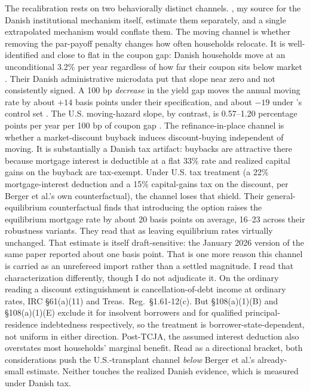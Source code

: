 \documentclass[12pt]{article}
\begin{document}
The recalibration rests on two behaviorally distinct channels. \citet{berger2026}, my source for the Danish institutional mechanism itself, estimate them separately, and a single extrapolated mechanism would conflate them. The moving channel is whether removing the par-payoff penalty changes how often households relocate. It is well-identified and close to flat in the coupon gap: Danish households move at an unconditional 3.2\% per year regardless of how far their coupon sits below market \citep[\S4.6, structural parameters in tab.~3]{berger2026}. Their Danish administrative microdata put that slope near zero and not consistently signed. A 100 bp \emph{decrease} in the yield gap moves the annual moving rate by about $+14$ basis points under their specification, and about $-19$ under \citeauthor{fonseca2024}'s control set \citep[\S3.3.2]{berger2026}. The U.S. moving-hazard slope, by contrast, is 0.57--1.20 percentage points per year per 100 bp of coupon gap \citep{fonseca2024}. The refinance-in-place channel is whether a market-discount buyback induces discount-buying independent of moving. It is substantially a Danish tax artifact: buybacks are attractive there because mortgage interest is deductible at a flat 33\% rate and realized capital gains on the buyback are tax-exempt. Under U.S. tax treatment (a 22\% mortgage-interest deduction and a 15\% capital-gains tax on the discount, per Berger et al.'s own counterfactual), the channel loses that shield. Their general-equilibrium counterfactual \citep[\S4.10.2]{berger2026} finds that introducing the option raises the equilibrium mortgage rate by about 20 basis points on average, 16--23 across their robustness variants. They read that as leaving equilibrium rates virtually unchanged. That estimate is itself draft-sensitive: the January 2026 version of the same paper reported about one basis point. That is one more reason this channel is carried as an unrefereed import rather than a settled magnitude. I read that characterization differently, though I do not adjudicate it. On the ordinary reading a discount extinguishment is cancellation-of-debt income at ordinary rates, IRC \S 61(a)(11) and Treas.\ Reg.\ \S 1.61-12(c). But \S 108(a)(1)(B) and \S 108(a)(1)(E) exclude it for insolvent borrowers and for qualified principal-residence indebtedness respectively, so the treatment is borrower-state-dependent, not uniform in either direction. Post-TCJA, the assumed interest deduction also overstates most households' marginal benefit. Read as a directional bracket, both considerations push the U.S.-transplant channel \emph{below} Berger et al.'s already-small estimate. Neither touches the realized Danish evidence, which is measured under Danish tax.
\end{document}
